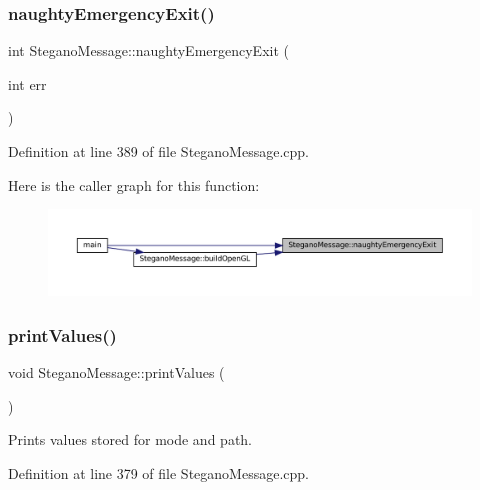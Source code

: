 \subsubsection{\texorpdfstring{naughtyEmergencyExit()}{naughtyEmergencyExit()}}
{\footnotesize\ttfamily int Stegano\+Message\+::naughty\+Emergency\+Exit (\begin{DoxyParamCaption}\item[{int}]{err }\end{DoxyParamCaption})\hspace{0.3cm}{\ttfamily [static]}}



Definition at line 389 of file Stegano\+Message.\+cpp.

Here is the caller graph for this function\+:\nopagebreak
\begin{figure}[H]
\begin{center}
\leavevmode
\includegraphics[width=350pt]{classSteganoMessage_a1fb7ba8950baa17684874ef931850a9c_icgraph}
\end{center}
\end{figure}
\mbox{\label{classSteganoMessage_a3ea3f5ff720bf56d33f168d47e2897b0}} 
\subsubsection{\texorpdfstring{printValues()}{printValues()}}
{\footnotesize\ttfamily void Stegano\+Message\+::print\+Values (\begin{DoxyParamCaption}{ }\end{DoxyParamCaption})}



Prints values stored for mode and path. 



Definition at line 379 of file Stegano\+Message.\+cpp.

